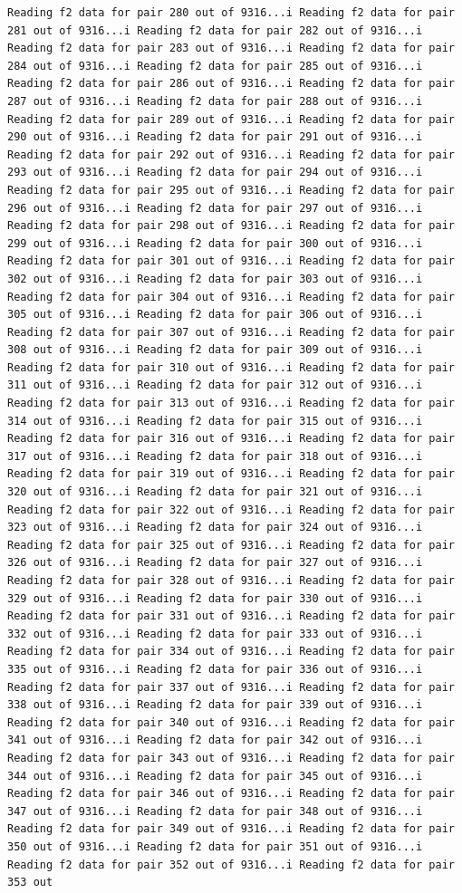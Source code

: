 \documentclass[
]{article}
\begin{document}
\begin{verbatim}
Reading f2 data for pair 280 out of 9316...i Reading f2 data for pair 281 out of 9316...i Reading f2 data for pair 282 out of 9316...i Reading f2 data for pair 283 out of 9316...i Reading f2 data for pair 284 out of 9316...i Reading f2 data for pair 285 out of 9316...i Reading f2 data for pair 286 out of 9316...i Reading f2 data for pair 287 out of 9316...i Reading f2 data for pair 288 out of 9316...i Reading f2 data for pair 289 out of 9316...i Reading f2 data for pair 290 out of 9316...i Reading f2 data for pair 291 out of 9316...i Reading f2 data for pair 292 out of 9316...i Reading f2 data for pair 293 out of 9316...i Reading f2 data for pair 294 out of 9316...i Reading f2 data for pair 295 out of 9316...i Reading f2 data for pair 296 out of 9316...i Reading f2 data for pair 297 out of 9316...i Reading f2 data for pair 298 out of 9316...i Reading f2 data for pair 299 out of 9316...i Reading f2 data for pair 300 out of 9316...i Reading f2 data for pair 301 out of 9316...i Reading f2 data for pair 302 out of 9316...i Reading f2 data for pair 303 out of 9316...i Reading f2 data for pair 304 out of 9316...i Reading f2 data for pair 305 out of 9316...i Reading f2 data for pair 306 out of 9316...i Reading f2 data for pair 307 out of 9316...i Reading f2 data for pair 308 out of 9316...i Reading f2 data for pair 309 out of 9316...i Reading f2 data for pair 310 out of 9316...i Reading f2 data for pair 311 out of 9316...i Reading f2 data for pair 312 out of 9316...i Reading f2 data for pair 313 out of 9316...i Reading f2 data for pair 314 out of 9316...i Reading f2 data for pair 315 out of 9316...i Reading f2 data for pair 316 out of 9316...i Reading f2 data for pair 317 out of 9316...i Reading f2 data for pair 318 out of 9316...i Reading f2 data for pair 319 out of 9316...i Reading f2 data for pair 320 out of 9316...i Reading f2 data for pair 321 out of 9316...i Reading f2 data for pair 322 out of 9316...i Reading f2 data for pair 323 out of 9316...i Reading f2 data for pair 324 out of 9316...i Reading f2 data for pair 325 out of 9316...i Reading f2 data for pair 326 out of 9316...i Reading f2 data for pair 327 out of 9316...i Reading f2 data for pair 328 out of 9316...i Reading f2 data for pair 329 out of 9316...i Reading f2 data for pair 330 out of 9316...i Reading f2 data for pair 331 out of 9316...i Reading f2 data for pair 332 out of 9316...i Reading f2 data for pair 333 out of 9316...i Reading f2 data for pair 334 out of 9316...i Reading f2 data for pair 335 out of 9316...i Reading f2 data for pair 336 out of 9316...i Reading f2 data for pair 337 out of 9316...i Reading f2 data for pair 338 out of 9316...i Reading f2 data for pair 339 out of 9316...i Reading f2 data for pair 340 out of 9316...i Reading f2 data for pair 341 out of 9316...i Reading f2 data for pair 342 out of 9316...i Reading f2 data for pair 343 out of 9316...i Reading f2 data for pair 344 out of 9316...i Reading f2 data for pair 345 out of 9316...i Reading f2 data for pair 346 out of 9316...i Reading f2 data for pair 347 out of 9316...i Reading f2 data for pair 348 out of 9316...i Reading f2 data for pair 349 out of 9316...i Reading f2 data for pair 350 out of 9316...i Reading f2 data for pair 351 out of 9316...i Reading f2 data for pair 352 out of 9316...i Reading f2 data for pair 353 out 
\end{verbatim}
\end{document}
